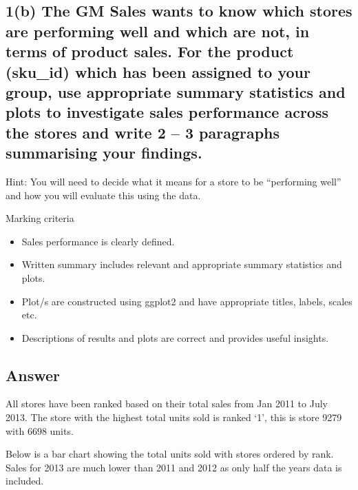 \documentclass[
  11pt,
]{article}
\begin{document}
\hypertarget{b-the-gm-sales-wants-to-know-which-stores-are-performing-well-and-which-are-not-in-terms-of-product-sales.-for-the-product-sku_id-which-has-been-assigned-to-your-group-use-appropriate-summary-statistics-and-plots-to-investigate-sales-performance-across-the-stores-and-write-2-3-paragraphs-summarising-your-findings.}{%
\subsection{1(b) The GM Sales wants to know which stores are performing
well and which are not, in terms of product sales. For the product
(sku\_id) which has been assigned to your group, use appropriate summary
statistics and plots to investigate sales performance across the stores
and write 2 -- 3 paragraphs summarising your
findings.}\label{b-the-gm-sales-wants-to-know-which-stores-are-performing-well-and-which-are-not-in-terms-of-product-sales.-for-the-product-sku_id-which-has-been-assigned-to-your-group-use-appropriate-summary-statistics-and-plots-to-investigate-sales-performance-across-the-stores-and-write-2-3-paragraphs-summarising-your-findings.}}

Hint: You will need to decide what it means for a store to be
``performing well'' and how you will evaluate this using the data.

Marking criteria

\begin{itemize}
\item
  Sales performance is clearly defined.
\item
  Written summary includes relevant and appropriate summary statistics
  and plots.
\item
  Plot/s are constructed using ggplot2 and have appropriate titles,
  labels, scales etc.
\item
  Descriptions of results and plots are correct and provides useful
  insights.
\end{itemize}

\hypertarget{answer-1}{%
\subsection{Answer}\label{answer-1}}

All stores have been ranked based on their total sales from Jan 2011 to
July 2013. The store with the highest total units sold is ranked `1',
this is store 9279 with 6698 units.

Below is a bar chart showing the total units sold with stores ordered by
rank. Sales for 2013 are much lower than 2011 and 2012 as only half the
years data is included.
\end{document}
